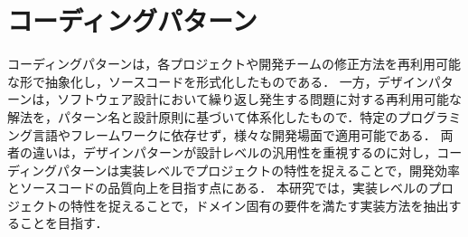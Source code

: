 \documentclass[11pt]{jreport}
\begin{document}
\section{コーディングパターン}
コーディングパターンは，各プロジェクトや開発チームの修正方法を再利用可能な形で抽象化し，ソースコードを形式化したものである．
一方，デザインパターンは，ソフトウェア設計において繰り返し発生する問題に対する再利用可能な解法を，パターン名と設計原則に基づいて体系化したもので．特定のプログラミング言語やフレームワークに依存せず，様々な開発場面で適用可能である\cite{GoF}．
両者の違いは，デザインパターンが設計レベルの汎用性を重視するのに対し，コーディングパターンは実装レベルでプロジェクトの特性を捉えることで，開発効率とソースコードの品質向上を目指す点にある．
本研究では，実装レベルのプロジェクトの特性を捉えることで，ドメイン固有の要件を満たす実装方法を抽出することを目指す．
\end{document}
